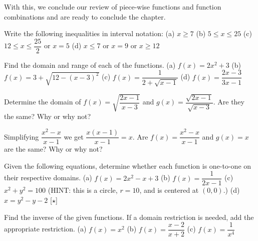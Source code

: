 \documentclass[lang=en,11pt]{elegantbook}
\begin{document}
With this, we conclude our review of piece-wise functions and function combinations and are ready to conclude the chapter.
\begin{reviewset}
\item Write the following inequalities in interval notation: \newline 
(a) $x\geq 7$ \hspace{60mm} (b) $5\leq x\leq 25$ \newline 
(c) $12\leq x\leq \dfrac{25}{2}$ or $x=5$ \hspace{34mm} (d) $x\leq 7$ or $x=9$ or $x\geq 12$

\item Find the domain and range of each of the functions.  \newline
(a) $f(x)=2x^2+3$ \hspace{44mm} (b) $f(x)=3+\sqrt{12-(x-3)^2}$ \newline 
(c) $f(x)=\dfrac{1}{2+\sqrt{x-1}}$ \hspace{37mm} (d) $f(x)=\dfrac{2x-3}{3x-1}$

\item Determine the domain of $f(x)=\sqrt{\dfrac{2x-1}{x-3}}$ and $g(x)=\dfrac{\sqrt{2x-1}}{\sqrt{x-3}}$.  Are they the same?  Why or why not?\vspace{2mm}

\item Simplifying $\dfrac{x^2-x}{x-1}$ we get $\dfrac{x(x-1)}{x-1}=x$.  Are $f(x)=\dfrac{x^2-x}{x-1}$ and $g(x)=x$ are the same?  Why or why not?\vspace{2mm}

\item Given the following equations, determine whether each function is one-to-one on their respective domains.  \newline
(a) $f(x)=2x^2-x+3$ \hspace{37mm} (b) $f(x)=\dfrac{1}{2x-1}$ \newline
(c) $x^2+y^2=100$ (HINT: this is a circle, $r=10$, and is centered at $(0,0)$.) \newline
(d) $x=y^2-y-2$ [$\star$]\vspace{2mm}

\item Find the inverse of the given functions.  If a domain restriction is needed, add the appropriate restriction.  \newline 
(a) $f(x)=x^2$ \hspace{25mm} (b) $f(x)=\dfrac{x-2}{x+2}$ \hspace{25mm} (c) $f(x)=\dfrac{1}{x^4}$\vspace{2mm}


\end{reviewset}
\end{document}
